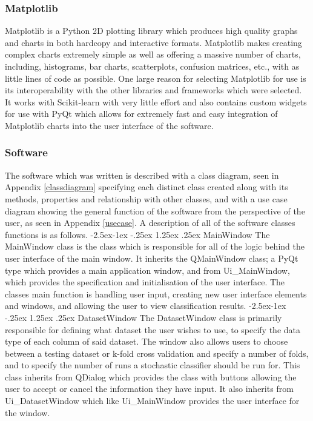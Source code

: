 \documentclass[12pt,a4paper]{article}
\makeatletter
\renewcommand\paragraph{\@startsection{paragraph}{4}{\z@}%
  {-2.5ex\@plus -1ex \@minus -.25ex}%
  {1.25ex \@plus .25ex}%
  {\normalfont\normalsize\bfseries}}
\makeatother
\begin{document}
\subsubsection{Matplotlib}
Matplotlib \parencite{matplotlib} is a Python 2D plotting library which produces high quality graphs and charts in both hardcopy and interactive formats. Matplotlib makes creating complex charts extremely simple as well as offering a massive number of charts, including, histograms, bar charts, scatterplots, confusion matrices, etc., with as little lines of code as possible. One large reason for selecting Matplotlib for use is its interoperability with the other libraries and frameworks which were selected. It works with Scikit-learn with very little effort and also contains custom widgets for use with PyQt which allows for extremely fast and easy integration of Matplotlib charts into the user interface of the software.

\subsubsection{Software}
The software which was written is described with a class diagram, seen in Appendix \ref{classdiagram} specifying each distinct class created along with its methods, properties and relationship with other classes, and with a use case diagram showing the general function of the software from the perspective of the user, as seen in Appendix \ref{usecase}. A description of all of the software classes functions is as follows.
\paragraph{MainWindow}
The MainWindow class is the class which is responsible for all of the logic behind the user interface of the main window. It inherits the QMainWindow class; a PyQt type which provides a main application window, and from Ui\_MainWindow, which provides the specification and initialisation of the user interface. The classes main function is handling user input, creating new user interface elements and windows, and allowing the user to view classification results.
\paragraph{DatasetWindow}
The DatasetWindow class is primarily responsible for defining what dataset the user wishes to use, to specify the data type of each column of said dataset. The window also allows users to choose between a testing dataset or k-fold cross validation and specify a number of folds, and to specify the number of runs a stochastic classifier should be run for. This class inherits from QDialog which provides the class with buttons allowing the user to accept or cancel the information they have input. It also inherits from Ui\_DatasetWindow which like Ui\_MainWindow provides the user interface for the window.
\end{document}
